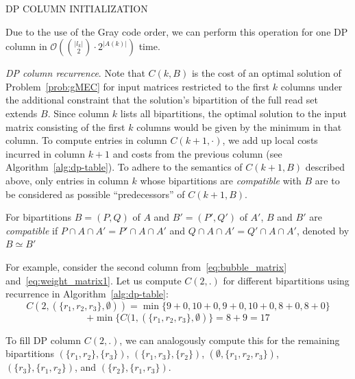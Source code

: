 \begin{algorithm}
    \caption{\label{alg:dp-column}\textsc{DP COLUMN INITIALIZATION}}
\end{algorithm}
Due to the use of the Gray code order, we can perform this operation for one DP column in $\mathcal{O}( {|l_k| \choose 2} \cdot 2^{|A(k)|})$ time.

\textit{DP column recurrence}.
Note that $C(k,B)$ is the cost of an optimal solution of Problem~\ref{prob:gMEC} for input matrices restricted to the first $k$ columns 
under the additional constraint that the solution's bipartition of the full read set extends $B$.
Since column $k$ lists all bipartitions, the optimal solution to the input matrix consisting of the first $k$ columns would be given by the minimum in that column.
To compute entries in column $C(k+1,\cdot)$, we add up local costs incurred in column $k+1$ and costs from the previous column (see Algorithm~\ref{alg:dp-table}).
To adhere to the semantics of $C(k+1,B)$ described above, only entries in column $k$ whose bipartitions are \emph{compatible} with $B$ are to be considered as possible ``predecessors'' of $C(k+1, B)$.

\begin{definition}
For bipartitions $B = (P, Q)$ of $A$ and $B' = (P', Q')$ of $A'$, $B$ and $B'$ are \emph{compatible} if $P \cap A \cap A' = P' \cap A \cap A'$ and $Q \cap A \cap A' = Q' \cap A \cap A'$, denoted by $B \simeq B'$
\end{definition}

For example, consider the second column from~\eqref{eq:bubble_matrix} and~\eqref{eq:weight_matrix1}. Let us compute $C(2,.)$ for different bipartitions using recurrence in Algorithm~\ref{alg:dp-table}:
\[C(2, (\{r_1,r_2,r_3\},\emptyset)) = \min\{9+0, 10+0, 9+0,10+0, 8+0, 8+0\} \]
\[ + \min\{C(1, (\{r_1,r_2,r_3\},\emptyset)\} = 8+9 = 17 \]

To fill DP column $C(2,.)$, we can analogously compute this for the remaining bipartitions $(\{r_1,r_2\},\{r_3\})$,
$(\{r_1,r_3\},\{r_2\})$, $(\emptyset,\{r_1,r_2,r_3\})$, $(\{r_3\},\{r_1,r_2\})$, and $(\{r_2\},\{r_1,r_3\})$.

